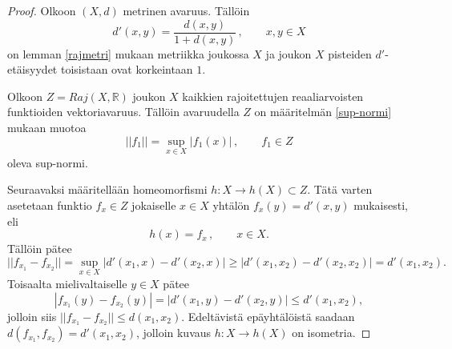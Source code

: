 \documentclass[12pt,a4paper,leqno]{report}
\newcommand{\R}{\mathbb{R}}
\theoremstyle{plain}
\theoremstyle{definition}
\theoremstyle{remark}
\begin{document}

\begin{proof} Olkoon $(X,d)$ metrinen avaruus. Tällöin 
$$d'(x,y)=\dfrac{d(x,y)}{1+d(x,y)} \, , \qquad x,y\in X$$
on lemman \ref{rajmetri} mukaan metriikka joukossa $X$ ja joukon $X$ pisteiden $d'$-etäisyydet toisistaan ovat korkeintaan $1$.


Olkoon $Z=Raj(X,\R )$ joukon $X$ kaikkien rajoitettujen %
reaaliarvoisten funktioiden vektoriavaruus. Tällöin avaruudella $Z$ on määritelmän \ref{sup-normi} mukaan muotoa
$$||f_1||=\sup_{x\in X} |f_1(x)| \, , \qquad f_1\in Z$$
oleva sup-normi.

Seuraavaksi määritellään homeomorfismi $h\colon X\rightarrow h(X)\subset Z$. Tätä varten asetetaan funktio $f_x\in Z$ jokaiselle $x\in X$ yhtälön $f_x (y)=d'(x,y)$ mukaisesti, eli
$$h(x)=f_x\, ,\qquad x\in X. $$  Tällöin pätee 
$$||f_{x_1} - f_{x_2} ||=\sup_{x\in X} |d'(x_1 , x )-d'(x_2 , x )| \geq |d'(x_1 , x_2 )-d'(x_2 , x_2 )|=d'(x_1 ,x_2 ).$$ 
Toisaalta mielivaltaiselle $y\in X$ pätee
$$|f_{x_1} (y)- f_{x_2} (y)|=|d'(x_1 ,y )-d'(x_2 ,y)|\leq d'(x_1 , x_2 ),$$
jolloin siis $||f_{x_1}-f_{x_2}||\leq d(x_1 , x_2 )$. Edeltävistä epäyhtälöistä saadaan $d(f_{x_1},f_{x_2})= d'(x_1 , x_2 )$, jolloin kuvaus $h\colon X\rightarrow h(X)$  on isometria.


\end{proof}
\end{document}
